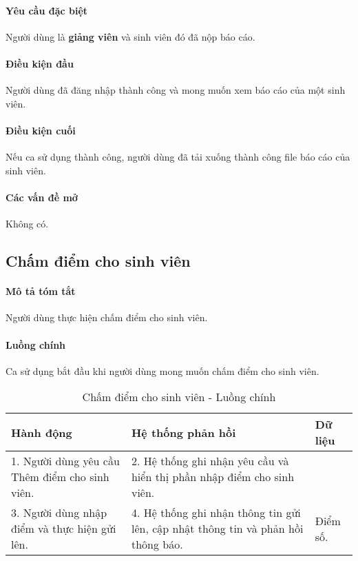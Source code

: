 \documentclass[./../main.tex]{subfiles}
\begin{document}
\paragraph*{Yêu cầu đặc biệt}

Người dùng là \textbf{giảng viên} và sinh viên đó đã nộp báo cáo.

\paragraph*{Điều kiện đầu}

Người dùng đã đăng nhập thành công và mong muốn xem báo cáo của một sinh viên.

\paragraph*{Điều kiện cuối}

Nếu ca sử dụng thành công, người dùng đã tải xuống thành công file báo cáo của sinh viên.

\paragraph*{Các vấn đề mở}

Không có.

\subsection{Chấm điểm cho sinh viên}

\paragraph*{Mô tả tóm tắt}

Người dùng thực hiện chấm điểm cho sinh viên.

\paragraph*{Luồng chính} Ca sử dụng bắt đầu khi người dùng mong muốn chấm điểm cho sinh viên.

\begin{table}[H]
  \caption{Chấm điểm cho sinh viên - Luồng chính}
  \label{tab:score}
  \begin{tabularx}{\textwidth}{|X|X|X|}
    \hline
\textbf{Hành động} & \textbf{Hệ thống phản hồi} & \textbf{Dữ liệu} \\ \hline
1. Người dùng yêu cầu Thêm điểm cho sinh viên. & 2. Hệ thống ghi nhận yêu cầu và hiển thị phần nhập điểm cho sinh viên. &  \\ \hline
3. Người dùng nhập điểm và thực hiện gửi lên. & 4. Hệ thống ghi nhận thông tin gửi lên, cập nhật thông tin và phản hồi thông báo. & Điểm số. \\ \hline
  \end{tabularx}
\end{table}
\end{document}
